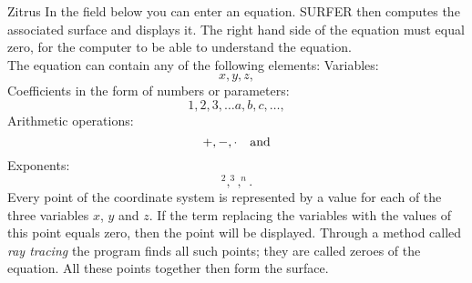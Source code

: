 \begin{surferPage}{Zitrus}
In the field below you can enter an equation. SURFER then computes the associated surface and displays it. The right hand side of the equation must equal zero, for the computer to be able to understand the equation. 
\\
The equation can contain any of the following elements:
\newline
Variables:
\[x, y, z, \]
Coefficients in the form of numbers or parameters:
\[1, 2, 3, \dots a, b, c, \dots, \]
Arithmetic operations:
\[+,  - , \cdot \quad \textnormal{and} \]
Exponents:
\[ ^2, ^3, ^n .\]
Every point of the coordinate system is represented by a value for each of the three variables  $x$, $y$ and $z$. If the term replacing the variables with the values of this point equals zero, then the point will be displayed. Through a method called \textit{ray tracing} the program finds all such points; they are called zeroes of the equation. All these points together then form the surface.
\end{surferPage}
